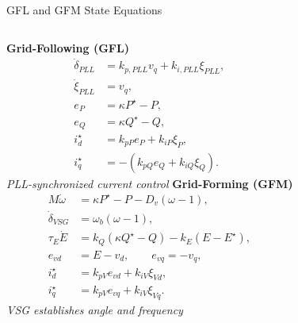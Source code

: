 \documentclass{beamer}
\begin{document}
\begin{frame}{GFL and GFM State Equations}
\begin{columns}[t,onlytextwidth]
\footnotesize
\textbf{Grid-Following (GFL)}
\begin{align*}
\dot{\delta}_{PLL}&=k_{p,PLL}v_q+k_{i,PLL}\xi_{PLL},\\
\dot{\xi}_{PLL}&=v_q,\\
e_P&=\kappa P^{\star}-P,\\ e_Q&=\kappa Q^{\star}-Q,\\
i_d^{\star}&=k_{pP}e_P+k_{iP}\xi_P,\\
i_q^{\star}&=-(k_{pQ}e_Q+k_{iQ}\xi_Q).
\end{align*}
\centering\textit{PLL-synchronized current control}
\footnotesize
\textbf{Grid-Forming (GFM)}
\begin{align*}
M\dot{\omega}&=\kappa P^{\star}-P-D_v(\omega-1),\\
\dot{\delta}_{VSG}&=\omega_b(\omega-1),\\
\tau_E\dot E&=k_Q(\kappa Q^{\star}-Q)-k_E(E-E^{\star}),\\
e_{vd}&=E-v_d,\qquad e_{vq}=-v_q,\\
i_d^{\star}&=k_{pV}e_{vd}+k_{iV}\xi_{Vd},\\
i_q^{\star}&=k_{pV}e_{vq}+k_{iV}\xi_{Vq}.
\end{align*}
\centering\textit{VSG establishes angle and frequency}
\end{columns}
\end{frame}
\end{document}
